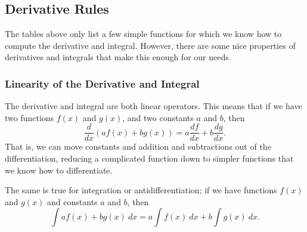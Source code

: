 \subsection{Derivative Rules}

The tables above only list a few simple functions for which we know how to compute the derivative and integral. However, there are some nice properties of derivatives and integrals that make this enough for our needs.

\subsubsection{Linearity of the Derivative and Integral}

The derivative and integral are both linear operators. This means that if we have two functions $f(x)$ and $g(x)$, and two constants $a$ and $b$, then 
\[ \frac{d}{dx}\left( af(x) + bg(x)\right) = a\frac{df}{dx} + b\frac{dg}{dx}. \] That is, we can move constants and addition and subtractions out of the differentiation, reducing a complicated function down to simpler functions that we know how to differentiate. 

The same is true for integration or antidifferentiation; if we have functions $f(x)$ and $g(x)$ and constants $a$ and $b$, then
\[ \int af(x) + bg(x) \ dx = a\int f(x)\ dx + b\int g(x)\ dx. \]

